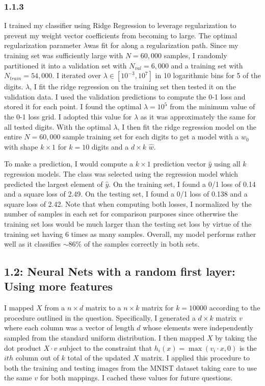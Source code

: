 \documentclass[12pt]{amsart}
\begin{document}
\subsubsection*{1.1.3}

I trained my classifier using Ridge Regression to leverage regularization to prevent my weight vector coefficients from becoming to large.  The optimal regularization parameter $\lambda$was fit for along a regularization path.  Since my training set was sufficiently large with $N = 60,000$ samples, I randomly partitioned it into a validation set with $N_{val} = 6,000$ and a training set with $N_{train} = 54,000$.  I iterated over $\lambda \in [10^{-3},10^{7}]$ in 10 logarithmic bins for 5 of the digits. $\lambda$, I fit the ridge regression on the training set then tested it on the validation data.  I used the validation predictions to compute the 0-1 loss and stored it for each point.  I found the optimal $\lambda = 10^5$ from the minimum value of the 0-1 loss grid.  I adopted this value for $\lambda$ as it was approximately the same for all tested digits.  With the optimal $\lambda$, I then fit the ridge regression model on the entire $N = 60,000$ sample training set for each digits to get a model with a $w_0$ with shape $k \times 1$ for $k = 10$ digits and a $d \times k$ $\hat{w}$.  

To make a prediction, I would compute a $k \times 1$ prediction vector $\hat{y}$ using all $k$ regression models.  The class was selected using the regression model which predicted the largest element of $\hat{y}$.  On the training set, I found a 0/1 loss of 0.14 and a square loss of 2.49.  On the testing set, I found a 0/1 loss of 0.138 and a square loss of 2.42.  Note that when computing both losses, I normalized by the number of samples in each set for comparison purposes since otherwise the training set loss would be much larger than the testing set loss by virtue of the training set having 6 times as many samples.  Overall, my model performs rather well as it classifies ${\sim}86\%$ of the samples correctly in both sets.

\subsection*{1.2: Neural Nets with a random first layer: Using more features}

I mapped $X$ from a $n \times d$ matrix to a $n \times k$ matrix for $k=10000$ according to the procedure outlined in the question.  Specifically, I generated a $d \times k$ matrix $v$ where each column was a vector of length $d$ whose elements were independently sampled from the standard uniform distribution.  I then mapped $X$ by taking the dot product $X \cdot v$ subject to the constraint that $h_i(x) = \max{(v_i \cdot x,0)}$ is the $ith$ column out of $k$ total of the updated $X$ matrix.  I applied this procedure to both the training and testing images from the MNIST dataset taking care to use the same $v$ for both mappings.  I cached these values for future questions.
\end{document}
